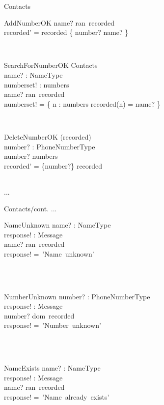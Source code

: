 \documentclass[12pt]{article}
\begin{document}
\begin{spacing}{1.5}
\begin{class}{Contacts}
\begin{op}{AddNumberOK}
name? \in ran~recorded\\
recorded' = recorded \cup \{ number? \mapsto name? \} \\
\end{op}\\
\begin{op}{SearchForNumberOK}
\Xi Contacts\\
name? : NameType\\
numberset! : \pset numbers\\
\ST
name? \in ran~recorded\\
numberset! = \{ n : numbers \cbar recorded(n) = name? \}
\end{op}\\
\begin{op}{DeleteNumberOK}
\Delta (recorded) \\
number? : PhoneNumberType\\
\ST
number? \in numbers\\
recorded' = \{number?\} \ndres recorded \\
\end{op}\\
...
\end{class}
\newpage
\begin{class}{Contacts/cont.}
...
\also
\\
\begin{op}{NameUnknown}
name? : NameType\\
response! : Message\\
\ST
name? \notin ran~recorded\\
response! =~'Name~unknown'
\end{op}\\
\\
\begin{op}{NumberUnknown}
number? : PhoneNumberType\\
response! : Message\\
\ST
number? \notin dom~recorded\\
response! =~'Number~unknown'
\end{op}\\
\\
\begin{op}{NameExists}
name? : NameType\\
response! : Message\\
\ST
name? \in ran~recorded\\
response! =~'Name~already~exists'
\end{op}\\

\end{class}
\end{spacing}
\end{document}
